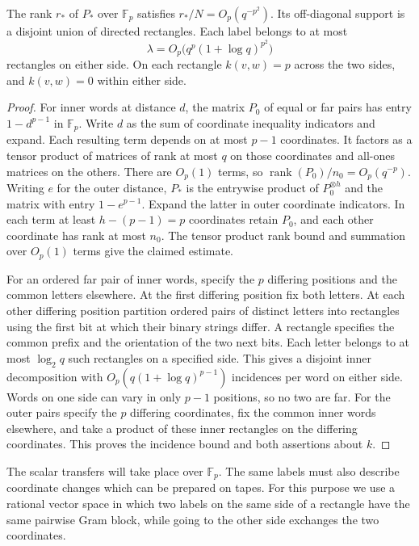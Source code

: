 \begin{lemma}\label{lem:interchange-labels}
The rank $r_*$ of $P_*$ over $\mathbb F_p$ satisfies
$r_*/N=O_p(q^{-p^2})$. Its off-diagonal support is a disjoint union
of directed rectangles. Each label belongs to at most
\[
          \lambda=O_p\big(q^p(1+\log q)^{p^2}\big)
\]
rectangles on either side. On each rectangle $k(v,w)=p$ across the
two sides, and $k(v,w)=0$ within either side.
\end{lemma}

\begin{proof}
For inner words at distance $d$, the matrix $P_0$ of equal or far
pairs has entry $1-d^{p-1}$ in $\mathbb F_p$. Write $d$ as the sum
of coordinate inequality indicators and expand. Each resulting term
depends on at most $p-1$ coordinates. It factors as a tensor product
of matrices of rank at most $q$ on those coordinates and all-ones
matrices on the others. There are $O_p(1)$ terms, so
$\operatorname{rank}(P_0)/n_0=O_p(q^{-p})$.
Writing $e$ for the outer distance, $P_*$ is the entrywise product of
$P_0^{\otimes h}$ and the matrix with entry $1-e^{p-1}$. Expand the
latter in outer coordinate indicators. In each term at least
$h-(p-1)=p$ coordinates retain $P_0$, and each other coordinate has
rank at most $n_0$. The tensor product rank bound and summation over
$O_p(1)$ terms give the claimed estimate.

For an ordered far pair of inner words, specify the $p$ differing
positions and the common letters elsewhere. At the first differing
position fix both letters. At each other differing position partition
ordered pairs of distinct letters into rectangles using the first bit
at which their binary strings differ. A rectangle specifies the common
prefix and the orientation of the two next bits. Each letter belongs
to at most $\log_2 q$ such rectangles on a specified side. This gives
a disjoint inner decomposition with
$O_p(q(1+\log q)^{p-1})$ incidences per word on either side. Words
on one side can vary in only $p-1$ positions, so no two are far.
For the outer pairs specify the $p$ differing coordinates, fix the
common inner words elsewhere, and take a product of these inner
rectangles on the differing coordinates. This proves the incidence
bound and both assertions about $k$.
\end{proof}

The scalar transfers will take place over $\mathbb F_p$. The same
labels must also describe coordinate changes which can be prepared on
tapes. For this purpose we use a rational vector space in which two
labels on the same side of a rectangle have the same pairwise Gram
block, while going to the other side exchanges the two coordinates.

